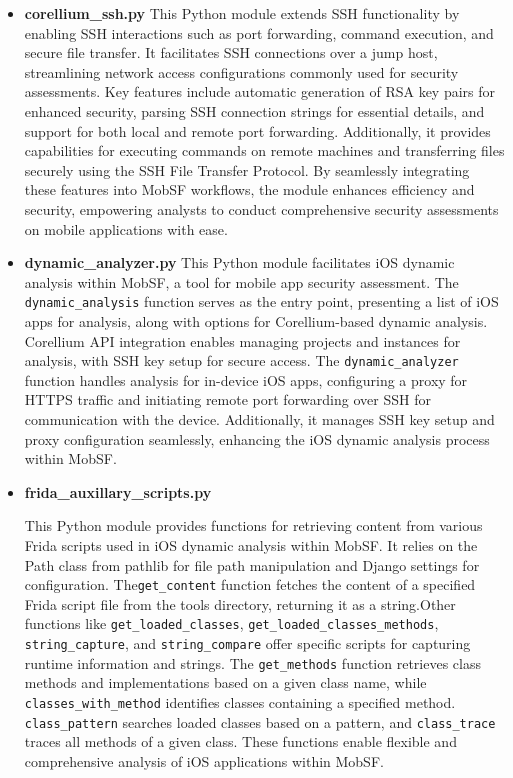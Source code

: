 \documentclass{report}
\begin{document}
\begin{itemize}
\begin{itemize}
        \item \textbf {corellium\_ssh.py}
        This Python module extends SSH functionality by enabling SSH interactions such as port forwarding, command execution, and secure file transfer. It facilitates SSH connections over a jump host, streamlining network access configurations commonly used for security assessments. Key features include automatic generation of RSA key pairs for enhanced security, parsing SSH connection strings for essential details, and support for both local and remote port forwarding. Additionally, it provides capabilities for executing commands on remote machines and transferring files securely using the SSH File Transfer Protocol. By seamlessly integrating these features into MobSF workflows, the module enhances efficiency and security, empowering analysts to conduct comprehensive security assessments on mobile applications with ease.

        \item \textbf{dynamic\_analyzer.py}
        This Python module facilitates iOS dynamic analysis within MobSF, a tool for mobile app security assessment. The \texttt{dynamic\_analysis} function serves as the entry point, presenting a list of iOS apps for analysis, along with options for Corellium-based dynamic analysis. Corellium API integration enables managing projects and instances for analysis, with SSH key setup for secure access. The \texttt{dynamic\_analyzer} function handles analysis for in-device iOS apps, configuring a proxy for HTTPS traffic and initiating remote port forwarding over SSH for communication with the device. Additionally, it manages SSH key setup and proxy configuration seamlessly, enhancing the iOS dynamic analysis process within MobSF.

        \item \textbf {frida\_auxillary\_scripts.py}
        
        This Python module provides functions for retrieving content from various Frida scripts used in iOS dynamic analysis within MobSF. It relies on the Path class from pathlib for file path manipulation and Django settings for configuration. The\texttt{get\_content} function fetches the content of a specified Frida script file from the tools directory, returning it as a string.Other functions like \texttt{get\_loaded\_classes}, \texttt{get\_loaded\_classes\_methods}, \texttt{string\_capture}, and \texttt{string\_compare} offer specific scripts for capturing runtime information and strings. The \texttt{get\_methods} function retrieves class methods and implementations based on a given class name, while \texttt{classes\_with\_method} identifies classes containing a specified method. \texttt{class\_pattern} searches loaded classes based on a pattern, and \texttt{class\_trace} traces all methods of a given class. These functions enable flexible and comprehensive analysis of iOS applications within MobSF.


\end{itemize}
\end{itemize}
\end{document}
